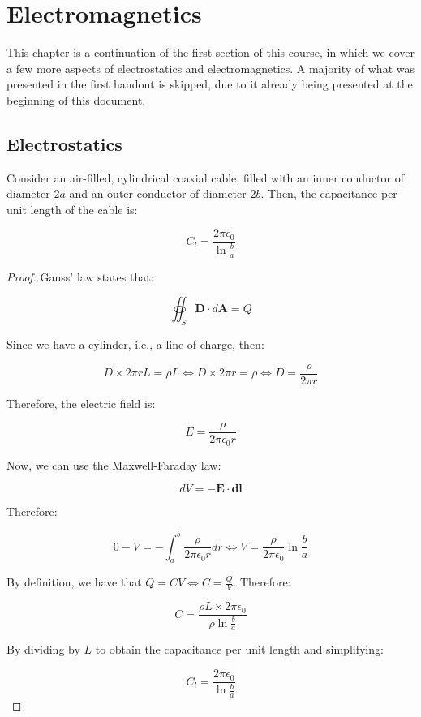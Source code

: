 \documentclass{article}
\begin{document}
\newpage

\section{Electromagnetics}

This chapter is a continuation of the first section of this course, in which we cover a few more aspects of electrostatics and electromagnetics. A majority of what was presented in the first handout is skipped, due to it already being presented at the beginning of this document.

\subsection{Electrostatics}

\begin{proposition}
    Consider an air-filled, cylindrical coaxial cable, filled with an inner conductor of diameter $2a$ and an outer conductor of diameter $2b$. Then, the capacitance per unit length of the cable is:

    \[ C_l = \frac{2\pi\epsilon_0}{\ln{\frac{b}{a}}} \] 
\end{proposition}

\begin{proof}
    Gauss' law states that:

    \[ \oiint_S \mathbf{D}\cdot d\mathbf{A} = Q \]

    Since we have a cylinder, i.e., a line of charge, then:

    \[ D \times 2\pi rL = \rho L \iff D \times 2\pi r = \rho \iff D = \frac{\rho}{2\pi r} \]

    Therefore, the electric field is:

    \[ E = \frac{\rho}{2\pi\epsilon_0 r} \]

    Now, we can use the Maxwell-Faraday law:

    \[ dV = -\mathbf{E} \cdot \mathbf{dl} \] 

    Therefore:

    \[ 0 - V = -\int_a^b \frac{\rho}{2\pi\epsilon_0 r}dr \iff V = \frac{\rho}{2\pi\epsilon_0}\ln{\frac{b}{a}} \]
    
    By definition, we have that $Q = CV \iff C = \frac{Q}{V}$. Therefore:

    \[ C = \frac{\rho L \times 2\pi\epsilon_0}{\rho \ln{\frac{b}{a}}} \]

    By dividing by $L$ to obtain the capacitance per unit length and simplifying:

    \[ C_l = \frac{2\pi\epsilon_0}{\ln{\frac{b}{a}}} \]
\end{proof}
\end{document}
